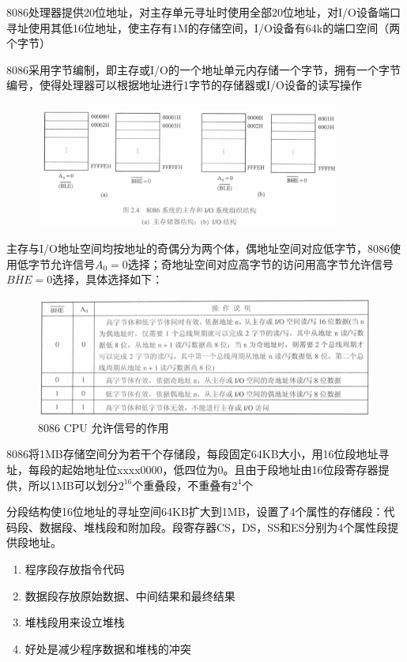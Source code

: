 \documentclass{article}
\begin{document}
8086处理器提供20位地址，对主存单元寻址时使用全部20位地址，对I/O设备端口寻址使用其低16位地址，使主存有1M的存储空间，I/O设备有64k的端口空间（两个字节）

8086采用字节编制，即主存或I/O的一个地址单元内存储一个字节，拥有一个字节编号，使得处理器可以根据地址进行1字节的存储器或I/O设备的读写操作

\begin{figure}[H]
    \centering
    \includegraphics[width=10cm]{img/2.2-1.png}
\end{figure}

主存与I/O地址空间均按地址的奇偶分为两个体，偶地址空间对应低字节，8086使用低字节允许信号$A_0=0$选择；奇地址空间对应高字节的访问用高字节允许信号$\overline{BHE}=0$选择，具体选择如下：

\begin{figure}[H]
    \centering
    \includegraphics[width=12cm]{img/2.2-2.png}
    \caption{8086 CPU 允许信号的作用}
\end{figure}

8086将1MB存储空间分为若干个存储段，每段固定64KB大小，用16位段地址寻址，每段的起始地址位xxxx0000，低四位为0。且由于段地址由16位段寄存器提供，所以1MB可以划分$2^{16}$个重叠段，不重叠有$2^{4}$个

分段结构使16位地址的寻址空间64KB扩大到1MB，设置了4个属性的存储段：代码段、数据段、堆栈段和附加段。段寄存器CS，DS，SS和ES分别为4个属性段提供段地址。

\begin{enumerate}
    \item 程序段存放指令代码
    \item 数据段存放原始数据、中间结果和最终结果
    \item 堆栈段用来设立堆栈
    \item 好处是减少程序数据和堆栈的冲突
\end{enumerate}
\end{document}

